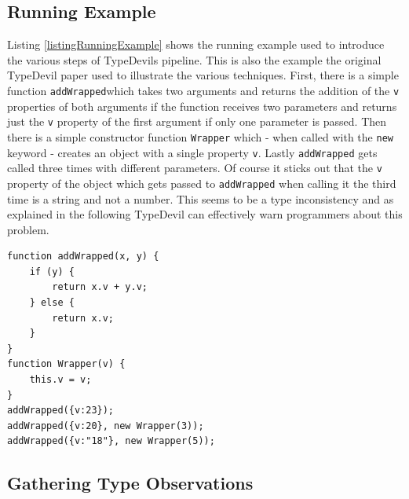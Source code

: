 \documentclass[runningheads,a4paper]{llncs}
\begin{document}
\subsection{Running Example}
Listing \ref{listingRunningExample} shows the running example used to introduce the various steps of TypeDevils pipeline.
This is also the example the original TypeDevil paper used to illustrate the various techniques.
First, there is a simple function \lstinline[columns=fixed]{addWrapped}which takes two arguments and returns the addition of the \lstinline[columns=fixed]{v} properties of both arguments if the function receives two parameters and returns just the \lstinline[columns=fixed]{v} property of the first argument if only one parameter is passed.
Then there is a simple constructor function \lstinline[columns=fixed]{Wrapper} which - when called with the \lstinline[columns=fixed]{new} keyword - creates an object with a single property \lstinline[columns=fixed]{v}.
Lastly \lstinline[columns=fixed]{addWrapped} gets called three times with different parameters.
Of course it sticks out that the \lstinline[columns=fixed]{v} property of the object which gets passed to \lstinline[columns=fixed]{addWrapped} when calling it the third time is a string and not a number.
This seems to be a type inconsistency and as explained in the following TypeDevil can effectively warn programmers about this problem.

\medskip\medskip
\lstset{language=javascript}
\begin{minipage}{\linewidth}
\begin{lstlisting}[frame=single, caption=Running Example, label=listingRunningExample]
function addWrapped(x, y) {
    if (y) {
        return x.v + y.v;
    } else {
        return x.v;
    }
}
function Wrapper(v) {
    this.v = v;
}
addWrapped({v:23});
addWrapped({v:20}, new Wrapper(3));
addWrapped({v:"18"}, new Wrapper(5));
\end{lstlisting}
\end{minipage}

\subsection{Gathering Type Observations}
\end{document}

